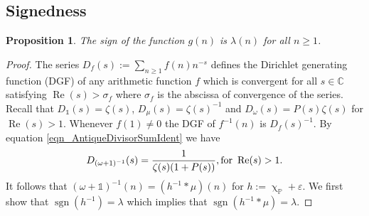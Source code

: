 \documentclass[11pt,reqno,a4letter]{article}
\numberwithin{equation}{section}
\numberwithin{figure}{section}
\numberwithin{table}{section}
\renewcommand{\chi}{\upchi}
\theoremstyle{plain}
\newtheorem{prop}[theorem]{Proposition}
\numberwithin{theorem}{section}
\theoremstyle{definition}
\theoremstyle{remark}
\renewcommand{\Re}{\operatorname{Re}}
\newcommand{\mathtext}[1]{\text{\rm #1}}
\begin{document}
\subsection{Signedness}
\label{Section_PrelimProofs_Config} 
\label{subSection_ProofOfSignednessOfgInvn_v1} 

\begin{prop}
\label{prop_SignageDirInvsOfPosBddArithmeticFuncs_v1} 
The sign of the function $g(n)$ is $\lambda(n)$ for all $n \geq 1$. 
\end{prop} 
\begin{proof} 
The series $D_f(s) := \sum_{n \geq 1} f(n) n^{-s}$ defines the 
Dirichlet generating function (DGF) of any 
arithmetic function $f$ which is convergent for all $s \in \mathbb{C}$ satisfying 
$\Re(s) > \sigma_f$ where $\sigma_f$ is the abscissa of convergence of the series. 
Recall that $D_{\mathds{1}}(s) = \zeta(s)$, $D_{\mu}(s) = \zeta(s)^{-1}$ and 
$D_{\omega}(s) = P(s) \zeta(s)$ for $\Re(s) > 1$. 
Whenever $f(1) \neq 0$ the DGF of $f^{-1}(n)$ is $D_f(s)^{-1}$. 
By equation \eqref{eqn_AntiqueDivisorSumIdent} we have 
\begin{align} 
\label{eqn_DGF_of_gInvn} 
D_{(\omega+1)^{-1}}(s) = \frac{1}{\zeta(s) (1+P(s))}, \mathtext{ for } \Re(s) > 1. 
\end{align} 
It follows that $(\omega + \mathds{1})^{-1}(n) = (h^{-1} \ast \mu)(n)$ for 
$h := \chi_{\mathbb{P}} + \varepsilon$. 
We first show that $\operatorname{sgn}(h^{-1}) = \lambda$ which implies that 
$\operatorname{sgn}(h^{-1} \ast \mu) = \lambda$. 


\end{proof}
\end{document}
